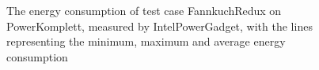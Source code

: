 \begin{figure}
                    \caption{The energy consumption of test case FannkuchRedux on PowerKomplett, measured by IntelPowerGadget, with the lines representing the minimum, maximum and average energy consumption} \label{fig:time_series_FannkuchRedux_PowerKomplett_IntelPowerGadget_exp2}
                    \end{figure}
                    